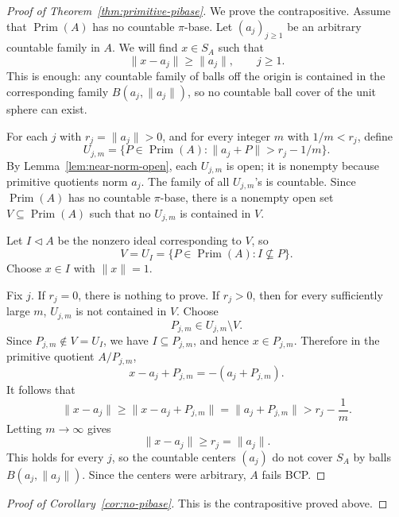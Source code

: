\documentclass[11pt]{article}
\newcommand{\Prim}{\operatorname{Prim}}
\begin{document}
\begin{proof}[Proof of Theorem~\ref{thm:primitive-pibase}]
We prove the contrapositive.  Assume that \(\Prim(A)\) has no countable
\(\pi\)-base.  Let \((a_j)_{j\ge1}\) be an arbitrary countable family in
\(A\).  We will find \(x\in S_A\) such that
\[
        \|x-a_j\|\ge \|a_j\|,\qquad j\ge1.
\]
This is enough: any countable family of balls off the origin is contained in
the corresponding family \(B(a_j,\|a_j\|)\), so no countable ball cover of
the unit sphere can exist.

For each \(j\) with \(r_j=\|a_j\|>0\), and for every integer \(m\) with
\(1/m<r_j\), define
\[
        U_{j,m}
        =
        \{P\in\Prim(A):\|a_j+P\|>r_j-1/m\}.
\]
By Lemma~\ref{lem:near-norm-open}, each \(U_{j,m}\) is open; it is nonempty
because primitive quotients norm \(a_j\).  The family of all \(U_{j,m}\)'s is
countable.  Since \(\Prim(A)\) has no countable \(\pi\)-base, there is a
nonempty open set \(V\subseteq\Prim(A)\) such that no \(U_{j,m}\) is contained
in \(V\).

Let \(I\triangleleft A\) be the nonzero ideal corresponding to \(V\), so
\[
        V=U_I=\{P\in\Prim(A):I\not\subseteq P\}.
\]
Choose \(x\in I\) with \(\|x\|=1\).

Fix \(j\).  If \(r_j=0\), there is nothing to prove.  If \(r_j>0\), then for
every sufficiently large \(m\), \(U_{j,m}\) is not contained in \(V\).  Choose
\[
        P_{j,m}\in U_{j,m}\setminus V.
\]
Since \(P_{j,m}\notin V=U_I\), we have \(I\subseteq P_{j,m}\), and hence
\(x\in P_{j,m}\).  Therefore in the primitive quotient \(A/P_{j,m}\),
\[
        x-a_j+P_{j,m}=-(a_j+P_{j,m}).
\]
It follows that
\[
        \|x-a_j\|
        \ge
        \|x-a_j+P_{j,m}\|
        =
        \|a_j+P_{j,m}\|
        >
        r_j-\frac1m.
\]
Letting \(m\to\infty\) gives
\[
        \|x-a_j\|\ge r_j=\|a_j\|.
\]
This holds for every \(j\), so the countable centers \((a_j)\) do not cover
\(S_A\) by balls \(B(a_j,\|a_j\|)\).  Since the centers were arbitrary,
\(A\) fails BCP.
\end{proof}

\begin{proof}[Proof of Corollary~\ref{cor:no-pibase}]
This is the contrapositive proved above.
\end{proof}
\end{document}
